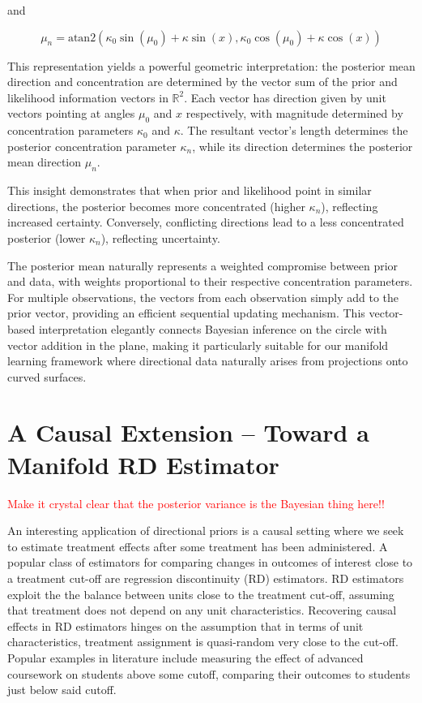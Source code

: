 \documentclass[twoside,11pt]{article}
\begin{document}
and 

$$\mu_n = \text{atan2}(\kappa_0\sin(\mu_0) + \kappa\sin(x), \kappa_0\cos(\mu_0) + \kappa\cos(x))$$

This representation yields a powerful geometric interpretation: the posterior mean direction and concentration are determined by the vector sum of the prior and likelihood information vectors in $\mathbb{R}^2$. Each vector has direction given by unit vectors pointing at angles $\mu_0$ and $x$ respectively, with magnitude determined by concentration parameters $\kappa_0$ and $\kappa$. The resultant vector's length determines the posterior concentration parameter $\kappa_n$, while its direction determines the posterior mean direction $\mu_n$. 

This insight demonstrates that when prior and likelihood point in similar directions, the posterior becomes more concentrated (higher $\kappa_n$), reflecting increased certainty. Conversely, conflicting directions lead to a less concentrated posterior (lower $\kappa_n$), reflecting uncertainty.

The posterior mean naturally represents a weighted compromise between prior and data, with weights proportional to their respective concentration parameters. For multiple observations, the vectors from each observation simply add to the prior vector, providing an efficient sequential updating mechanism. This vector-based interpretation elegantly connects Bayesian inference on the circle with vector addition in the plane, making it particularly suitable for our manifold learning framework where directional data naturally arises from projections onto curved surfaces.

\section{A Causal Extension -- Toward a Manifold RD Estimator}\label{sc:causal}

\textcolor{red}{Make it crystal clear that the posterior variance is the Bayesian thing here!!}

An interesting application of directional priors is a causal setting where we seek to estimate treatment effects after some treatment has been administered. A popular class of estimators for comparing changes in outcomes of interest close to a treatment cut-off are regression discontinuity (RD) estimators. RD estimators exploit the the balance between units close to the treatment cut-off, assuming that treatment does not depend on any unit characteristics. Recovering causal effects in RD estimators hinges on the assumption that in terms of unit characteristics, treatment assignment is quasi-random very close to the cut-off. Popular examples in literature include measuring the effect of advanced coursework on students above some cutoff, comparing their outcomes to students just below said cutoff. 
\end{document}
